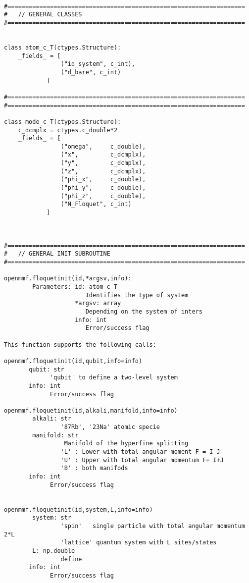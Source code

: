 \documentclass[10pt,a4paper]{article}
\begin{document}
\begin{verbatim}

#===================================================================
#   // GENERAL CLASSES
#===================================================================


class atom_c_T(ctypes.Structure):
    _fields_ = [
                ("id_system", c_int),
                ("d_bare", c_int)            
            ]

#===================================================================
#===================================================================

class mode_c_T(ctypes.Structure):
    c_dcmplx = ctypes.c_double*2
    _fields_ = [
                ("omega",     c_double),
                ("x",         c_dcmplx),
                ("y",         c_dcmplx),
                ("z",         c_dcmplx),            
                ("phi_x",     c_double),
                ("phi_y",     c_double),
                ("phi_z",     c_double),
                ("N_Floquet", c_int)
            ]



#===================================================================
#   // GENERAL INIT SUBROUTINE
#===================================================================

openmmf.floquetinit(id,*argsv,info):
        Parameters: id: atom_c_T
                       Identifies the type of system
                    *argsv: array
                       Depending on the system of inters
                    info: int
                       Error/success flag

This function supports the following calls:

openmmf.floquetinit(id,qubit,info=info)
       qubit: str
             'qubit' to define a two-level system
       info: int
             Error/success flag

openmmf.floquetinit(id,alkali,manifold,info=info)
        alkali: str
                '87Rb', '23Na' atomic specie
        manifold: str
                 Manifold of the hyperfine splitting
                'L' : Lower with total angular moment F = I-J
                'U' : Upper with total angular momentum F= I+J
                'B' : both manifods
       info: int
             Error/success flag
                

openmmf.floquetinit(id,system,L,info=info)
        system: str
                'spin'   single particle with total angular momentum 2*L
                'lattice' quantum system with L sites/states 
        L: np.double
                define
       info: int
             Error/success flag



\end{verbatim}
\end{document}
